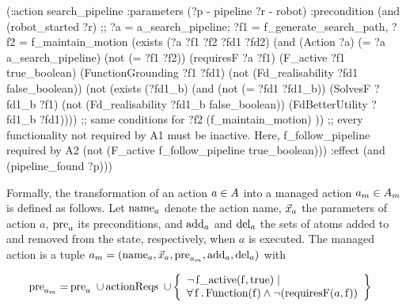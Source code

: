 \begin{listing}[tbp]
\begin{Piton}[language=PDDL]
(:action search_pipeline
  :parameters (?p - pipeline ?r - robot)
  :precondition (and
    (robot_started ?r)
    ;; ?a = a_search_pipeline; ?f1 = f_generate_search_path, ?f2 = f_maintain_motion
    (exists (?a ?f1 ?f2 ?fd1 ?fd2)
      (and
        (Action ?a)
        (= ?a a_search_pipeline)
        (not (= ?f1 ?f2))
        (requiresF ?a ?f1)
        (F_active ?f1 true_boolean)
        (FunctionGrounding ?f1 ?fd1)
        (not (Fd_realisability ?fd1 false_boolean))
        (not
          (exists (?fd1_b)
            (and
              (not (= ?fd1 ?fd1_b))
              (SolvesF ?fd1_b ?f1)
              (not (Fd_realisability ?fd1_b false_boolean))
              (FdBetterUtility  ?fd1_b ?fd1))))
        ;; same conditions for ?f2 (f_maintain_motion)
      ))
    ;; every functionality not required by A1 must be inactive. Here, f_follow_pipeline required by A2
    (not (F_active f_follow_pipeline true_boolean)))
  :effect (and (pipeline_found ?p)))
\end{Piton}
\caption{Managed \texttt{search\_pipeline} action}%
\label{planta:lst:search_pipeline_managed}
\end{listing}

Formally, the transformation of an action $a \in A$ into a managed action
$a_m \in A_m$ is defined as follows. Let $\operatorname{name}_a$ denote the action name,
$\vec{x}_a$ the parameters of action $a$, $\operatorname{pre}_a$ its preconditions, and
$\operatorname{add}_a$ and $\operatorname{del}_a$ the sets of atoms added to and removed from the state,
respectively, when $a$ is executed. The managed action is a tuple
$a_m = (\operatorname{name}_a, \vec{x}_a, \operatorname{pre}_{a_m}, \operatorname{add}_a, \operatorname{del}_a)$ with

\begin{align*}
    \operatorname{pre}_{a_m} =& \operatorname{pre}_a  ~ \cup \operatorname{actionReqs} ~ \cup
    \left\lbrace\begin{array}{l}\neg \operatorname{f\_active}(\operatorname{f}, \operatorname{true}) \mid \\
    \forall \operatorname{f}. \operatorname{Function}(\operatorname{f}) \land \neg(\operatorname{requiresF}(a, \operatorname{f})) \end{array}\right\rbrace
\end{align*}

